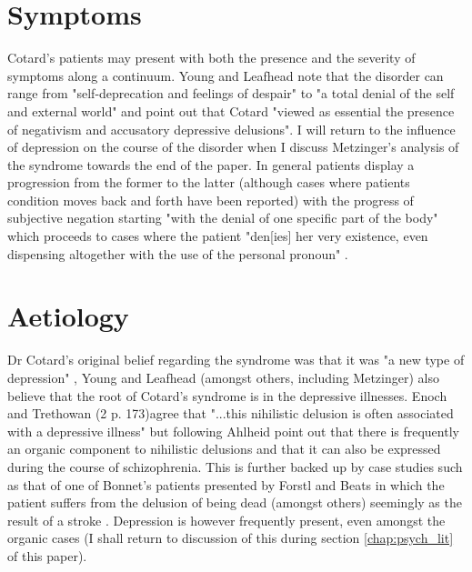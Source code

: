 \section{Symptoms}

Cotard's patients may present with both the presence and the severity of symptoms along a continuum. Young and Leafhead \cite{young1995} note that the disorder can range from "self-deprecation and feelings of despair" to "a total denial of the self and external world" and point out that Cotard "viewed as essential the presence of negativism and accusatory depressive delusions". I will return to the influence of depression on the course of the disorder when I discuss Metzinger's analysis of the syndrome towards the end of the paper. In general patients display a progression from the former to the latter (although cases where patients condition moves back and forth have been reported) with the progress of subjective negation starting "with the denial of one specific part of the body" which proceeds to cases where the patient "den[ies] her very existence, even dispensing altogether with the use of the personal pronoun" \cite{young1995}.

\section{Aetiology}

Dr Cotard's original belief regarding the syndrome was that it was "a new type of depression" \cite[p. 185]{berrios1995b}, Young and Leafhead (amongst others, including Metzinger) also believe that the root of Cotard's syndrome is in the depressive illnesses. Enoch and Trethowan (2 p. 173)agree that "...this nihilistic delusion is often associated with a depressive illness" but following Ahlheid \cite{ahlheid1968} point out that there is frequently an organic component to nihilistic delusions and that it can also be expressed during the course of schizophrenia. This is further backed up by case studies such as that of one of Bonnet's patients presented by Forstl and Beats in which the patient suffers from the delusion of being dead (amongst others) seemingly as the result of a stroke \cite{forstl1992}. Depression is however frequently present, even amongst the organic cases (I shall return to discussion of this during section \ref{chap:psych_lit} of this paper).

\section{Honesty, confabulation and the Cotard's syndrome patient}

